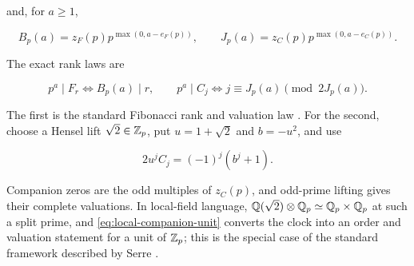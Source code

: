 and, for $a\geqslant1$,

\begin{equation}
 B_p(a)=z_F(p)p^{\max(0,a-e_F(p))},
 \qquad
 J_p(a)=z_C(p)p^{\max(0,a-e_C(p))}.
 \label{eq:lifted-ranks}
\end{equation}

The exact rank laws are

\begin{equation}
 p^a\mid F_r\Longleftrightarrow B_p(a)\mid r,
 \qquad
 p^a\mid C_j\Longleftrightarrow
 j\equiv J_p(a)\pmod {2J_p(a)}.
 \label{eq:rank-laws}
\end{equation}

The first is the standard Fibonacci rank and valuation law
\cite{Lengyel1995,Sanna2016}. For the second, choose a Hensel lift
$\sqrt2\in\mathbb{Z}_p$, put $u=1+\sqrt2$ and $b=-u^2$, and use

\begin{equation}
 2u^jC_j=(-1)^j(b^j+1).
 \label{eq:local-companion-unit}
\end{equation}

Companion zeros are the odd multiples of $z_C(p)$, and odd-prime lifting
gives their complete valuations. In local-field language,
$\mathbb{Q}(\sqrt2)\otimes\mathbb{Q}_p\simeq\mathbb{Q}_p\times\mathbb{Q}_p$ at such a split prime, and
\cref{eq:local-companion-unit} converts the clock into an order and
valuation statement for a unit of $\mathbb{Z}_p$; this is the special case of the
standard framework described by Serre \cite{Serre1979LocalFields}.

